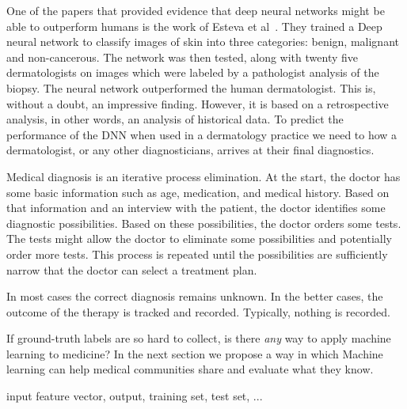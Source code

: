 \documentclass[fleqn,10pt]{wlscirep}
\begin{document}
One of the papers that provided evidence that deep neural networks might be able to outperform humans is the work of Esteva et al~\cite{esteva2017dermatologist}. They trained a Deep neural network to classify images of skin into three categories: benign, malignant and non-cancerous. The network was then tested, along with twenty five dermatologists on images which were labeled by a pathologist analysis of the biopsy. The neural network outperformed the human dermatologist. This is, without a doubt, an impressive finding. However, it is based on a retrospective analysis, in other words, an analysis of historical data. To predict the performance of the DNN when used in a dermatology practice we need to how a dermatologist, or any other diagnosticians, arrives at their final diagnostics.

Medical diagnosis is an iterative process elimination. At the start, the doctor has some basic information such as age, medication, and medical history. Based on that information and an interview with the patient, the doctor identifies some diagnostic possibilities. Based on these possibilities, the doctor orders some tests. The tests might allow the doctor to eliminate some possibilities and potentially order more tests. This process is repeated until the possibilities are sufficiently narrow that the doctor can select a treatment plan. 

In most cases the correct diagnosis remains unknown. In the better cases, the outcome of the therapy is tracked and recorded. Typically, nothing is recorded.

If ground-truth labels are so hard to collect, is there {\em any} way to apply machine learning to medicine?
In the next section we propose a way in which  Machine learning can help medical communities
share and evaluate what they know.

input feature vector, output, training set, test set, ...
\end{document}
